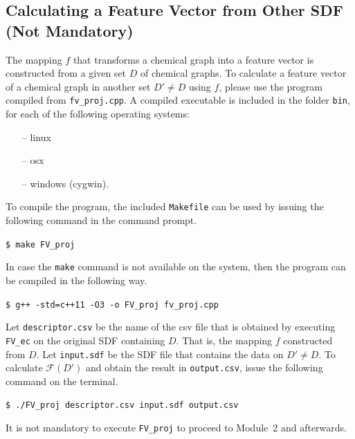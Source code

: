 \documentclass[11pt,titlepage,dvipdfmx,twoside]{book}
\begin{document}
\subsection{Calculating a Feature Vector from Other SDF (Not Mandatory)}

The mapping $f$ that transforms a chemical graph
into a feature vector is constructed from a given
set $D$ of chemical graphs.
To calculate a feature vector
of a chemical graph in another set $D'\ne D$
using $f$, please use the program compiled from 
{\tt fv\_proj.cpp}. 
A compiled executable is included in the folder {\tt bin},
for each of the following operating systems:
%
\begin{itemize}
 \item [--] linux
 \item [--] osx
 \item [--] windows (cygwin).
\end{itemize}

To compile the program, the included {\tt Makefile}
can be used by issuing the following command in the command prompt.
\begin{oframed}
{\small
\verb|$ make FV_proj|
}
\end{oframed}
In case the {\tt make} command is not available on the system,
then the program can be compiled in the following way.
\begin{oframed}
{\small
\verb|$ g++ -std=c++11 -O3 -o FV_proj fv_proj.cpp|
}
\end{oframed}

Let {\tt descriptor.csv}
be the name of the csv file that is obtained by
executing {\tt FV\_ec} on the original SDF containing $D$.
That is, the mapping $f$ constructed from $D$.
Let {\tt input.sdf} be the SDF file
that contains the data on $D'\ne D$.
To calculate ${\mathcal F}(D')$ and
obtain the result in {\tt output.csv},
issue the following command on the terminal. 
\begin{oframed}
{\small
\verb|$ ./FV_proj descriptor.csv input.sdf output.csv|
}
\end{oframed}


It is not mandatory to execute {\tt FV\_proj} to proceed to Module~2 and afterwards.
\end{document}
